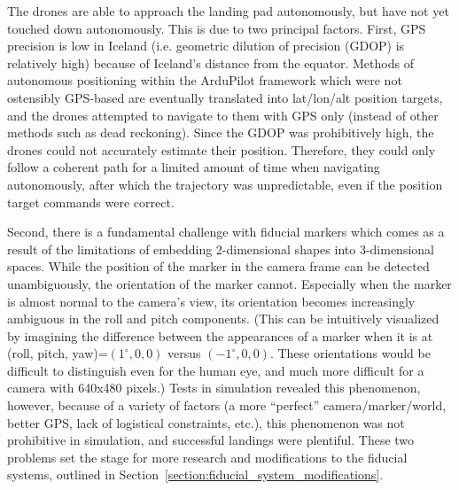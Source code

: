 The drones are able to approach the landing pad autonomously,
but have not yet touched down autonomously.
This is due to two principal factors.
First, GPS precision is low in Iceland (i.e. geometric dilution of precision (GDOP) is relatively high)
because of Iceland's distance from the equator.
Methods of autonomous positioning within the ArduPilot framework which were not ostensibly GPS-based
are eventually translated into lat/lon/alt position targets,
and the drones attempted to navigate to them with GPS only (instead of other methods such as dead reckoning).
Since the GDOP was prohibitively high, the drones could not accurately estimate their position.
Therefore, they could only follow a coherent path for a limited amount of time when navigating autonomously,
after which the trajectory was unpredictable, even if the position target commands were correct.

Second, there is a fundamental challenge with fiducial markers
which comes as a result of the limitations of embedding 2-dimensional shapes into 3-dimensional spaces.
While the position of the marker in the camera frame can be detected unambiguously,
the orientation of the marker cannot.
Especially when the marker is almost normal to the camera's view,
its orientation becomes increasingly ambiguous in the roll and pitch components.
(This can be intuitively visualized by imagining the difference between the appearances of a marker
when it is at (roll, pitch, yaw)=$(1^{\circ}, 0, 0)$ versus $(-1^{\circ}, 0, 0)$.
These orientations would be difficult to distinguish even for the human eye, and much more difficult
for a camera with 640x480 pixels.)
Tests in simulation revealed this phenomenon, however, because of a variety of factors
(a more ``perfect'' camera/marker/world, better GPS, lack of logistical constraints, etc.),
this phenomenon was not prohibitive in simulation, and successful landings were plentiful.
These two problems set the stage for more research and modifications to the fiducial systems,
outlined in Section~\ref{section:fiducial_system_modifications}.